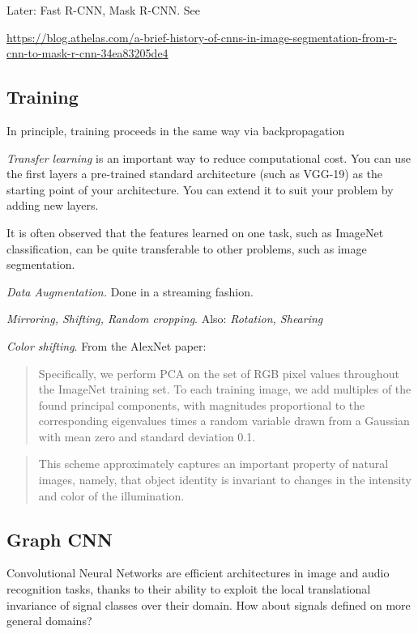 \documentclass[english]{article}
\begin{document}
Later: Fast R-CNN, Mask R-CNN. See  

\url{https://blog.athelas.com/a-brief-history-of-cnns-in-image-segmentation-from-r-cnn-to-mask-r-cnn-34ea83205de4}
\eenum

\subsection{Training}
\benum
\item In principle, training proceeds in the same way via backpropagation
\item \emph{Transfer learning} is an important way to reduce computational cost. You can use the first layers a pre-trained standard architecture (such as VGG-19) as the starting point of your architecture. You can extend it to suit your problem by adding new layers. 

It is often observed that the features learned on one task, such as ImageNet classification, can be quite transferable to other problems, such as image segmentation. 

\item \emph{Data Augmentation.} Done in a streaming fashion. 

\emph{Mirroring, Shifting, Random cropping}. Also: \emph{Rotation, Shearing}

\emph{Color shifting}. From the AlexNet paper: 


\begin{quote}
Specifically, we perform PCA on the set of RGB pixel values throughout the
ImageNet training set. To each training image, we add multiples of the found principal components,
with magnitudes proportional to the corresponding eigenvalues times a random variable drawn from
a Gaussian with mean zero and standard deviation 0.1.
\end{quote}


\begin{quote}
This scheme approximately captures an important property of natural images,
namely, that object identity is invariant to changes in the intensity and color of the illumination.
\end{quote}
\eenum



\subsection{Graph CNN}
%
\bitem
\item Convolutional Neural Networks are efficient architectures in image and
audio recognition tasks, thanks to their ability to exploit the local translational
invariance of signal classes over their domain. How about signals defined on more general domains?
\end{document}
